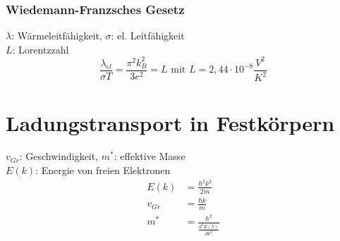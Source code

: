 \documentclass[a4paper,twocolumn,10pt]{article}
\begin{document}
\subsubsection{Wiedemann-Franzsches Gesetz}
$\lambda$: Wärmeleitfähigkeit, $\sigma$: el. Leitfähigkeit\\
$L$: Lorentzzahl
\begin{equation*}
\frac{\lambda_{el}}{\sigma T}=\frac{\pi^2k_B^2}{3e^2}=L\text{ mit }L=2,44\cdot 10^{-8}\frac{V^2}{K^2}
\end{equation*}

\section{Ladungstransport in Festkörpern}
$v_{Gr}$: Geschwindigkeit, $m^*$: effektive Masse\\
$E(k)$: Energie von freien Elektronen
\begin{equation*}
\begin{split}
E(k)&=\frac{\hbar^2k^2}{2m}\\
v_{Gr}&=\frac{\hbar k}{m}\\
m^*&=\frac{\hbar^2}{\frac{d^2E(k)}{dk^2}}
\end{split}
\end{equation*}
\end{document}

